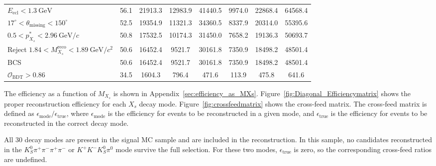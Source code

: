 \begin{table}
\begin{tabularx}{0.95\textheight}{
        >{\raggedright\arraybackslash}X ||
        c | c | c | c | c | c | c
    }
        $E_{\textrm{ecl}} < 1.3~\textrm{GeV}$
        & 56.1
        & 21913.3
        & 12983.9
        & 41440.5
        & 9974.0
        & 22868.4
        & 64568.4 \\

        $17^\circ < \theta_{\textrm{missing}} < 150^\circ$
        & 52.5
        & 19354.9
        & 11321.3
        & 34360.5
        & 8337.9
        & 20314.0
        & 55395.6 \\

        $0.5 < p_{X_{s}}^{*} < 2.96~\textrm{GeV}/c$
        & 50.8
        & 17532.5
        & 10174.3
        & 31450.0
        & 7658.2
        & 19136.3
        & 50693.7 \\

        Reject $1.84 < M_{X_{s}}^{\textrm{reco}} < 1.89~\textrm{GeV}/c^{2}$
        & 50.6
        & 16452.4
        & 9521.7
        & 30161.8
        & 7350.9
        & 18498.2
        & 48501.4 \\

        BCS
        & 50.6
        & 16452.4
        & 9521.7
        & 30161.8
        & 7350.9
        & 18498.2
        & 48501.4 \\

        $\mathcal{O}_{\textrm{BDT}} > 0.86$
        & 34.5
        & 1604.3
        & 796.4
        & 471.6
        & 113.9
        & 475.8
        & 641.6 \\

        \hline
        \hline
    \end{tabularx}
    \label{tab:cutflow}
\end{table}
The efficiency as a function of $M_{X_{s}}$ is shown in Appendix~\ref{sec:efficiency_as_MXs}.
Figure~\ref{fig:Diagonal_Efficiencymatrix} shows the proper reconstruction efficiency for each $X_{s}$ decay mode.
Figure~\ref{fig:crossfeedmatrix} shows the cross-feed matrix.
The cross-feed matrix is defined as $\epsilon_{\mathrm{mode}}/\epsilon_{\mathrm{true}}$, where $\epsilon_{\mathrm{mode}}$ is the efficiency for events to be reconstructed in a given mode, and $\epsilon_{\mathrm{true}}$ is the efficiency for events to be reconstructed in the correct decay mode.

All 30 decay modes are present in the signal MC sample and are included in the reconstruction.
In this sample, no candidates reconstructed in the $K_{S}^{0}\pi^{+}\pi^{-}\pi^{+}\pi^{-}$ or $K^{+}K^{-}K_{S}^{0}\pi^{0}$ mode survive the full selection.
For these two modes, $\epsilon_{\mathrm{true}}$ is zero, so the corresponding cross-feed ratios are undefined.

